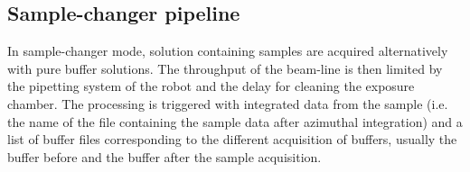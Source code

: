 \documentclass[preprint]{iucr}              %
\begin{document}





\subsection{Sample-changer pipeline}
\label{sc-pipeline}
In sample-changer mode, solution containing samples are acquired alternatively with pure buffer solutions.
The throughput of the beam-line is then limited by the pipetting system of the robot and the delay for cleaning the exposure chamber.  
The processing is triggered with integrated data from the sample (i.e. the name of the file containing the sample data after azimuthal integration) and a list of 
buffer files corresponding to the different acquisition of buffers, usually the buffer before and the buffer after the sample acquisition.
\end{document}

